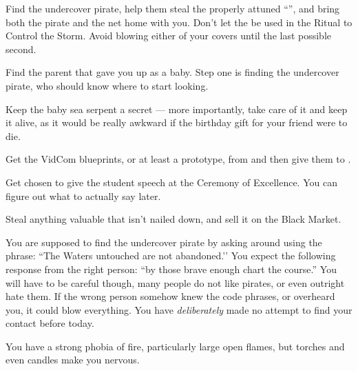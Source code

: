 \documentclass[char]{GL2020}
\begin{document}
\begin{itemz}
    \item Find the undercover pirate, help them steal the properly attuned ``\iNet{}'', and bring both the pirate and the net home with you. Don't let the \iNet{} be used in the Ritual to Control the Storm. Avoid blowing either of your covers until the last possible second.
    \item Find the parent that gave you up as a baby. Step one is finding the undercover pirate, who should know where to start looking.
    \item Keep the baby sea serpent a secret — more importantly, take care of it and keep it alive, as it would be really awkward if the birthday gift for your friend were to die.
    \item Get the VidCom blueprints, or at least a prototype, from \cTechStar{} and then give them to \cChupLeader{}.
    \item Get chosen to give the student speech at the Ceremony of Excellence. You can figure out what to actually say later.
    \item Steal anything valuable that isn’t nailed down, and sell it on the Black Market.
\end{itemz}

\begin{itemz}[Notes]
    \item You are supposed to find the undercover pirate by asking around using the phrase: ``The Waters untouched are not abandoned.'’ You expect the following response from the right person: ``by those brave enough chart the course.'' You will have to be careful though, many people do not like pirates, or even outright hate them. If the wrong person somehow knew the code phrases, or overheard you, it could blow everything. You have \emph{deliberately} made no attempt to find your contact before today.
    \item You have a strong phobia of fire, particularly large open flames, but torches and even candles make you nervous.
\end{itemz}
\end{document}
